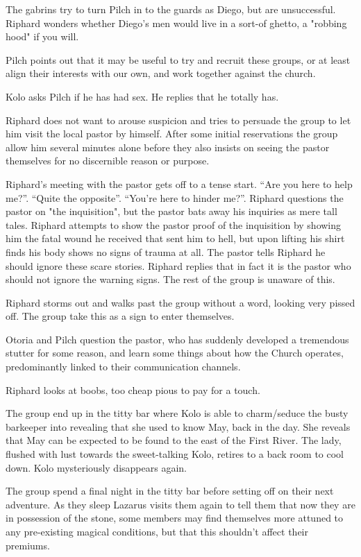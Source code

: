 The gabrins try to turn Pilch in to the guards as Diego, but are unsuccessful. Riphard wonders whether Diego's men would live in a sort-of ghetto, a "robbing hood" if you will.\medskip

Pilch points out that it may be useful to try and recruit these groups, or at least align their interests with our own, and work together against the church.\medskip

Kolo asks Pilch if he has had sex. He replies that he totally has.\medskip

Riphard does not want to arouse suspicion and tries to persuade the group to let him visit the local pastor by himself. After some initial reservations the group allow him several minutes alone before they also insists on seeing the pastor themselves for no discernible reason or purpose.\medskip

Riphard's meeting with the pastor gets off to a tense start. “Are you here to help me?”. “Quite the opposite”. “You’re here to hinder me?”. Riphard questions the pastor on "the inquisition", but the pastor bats away his inquiries as mere tall tales. Riphard attempts to show the pastor proof of the inquisition by showing him the fatal wound he received that sent him to hell, but upon lifting his shirt finds his body shows no signs of trauma at all. The pastor tells Riphard he should ignore these scare stories. Riphard replies that in fact it is the pastor who should not ignore the warning signs. The rest of the group is unaware of this.\medskip

Riphard storms out and walks past the group without a word, looking very pissed off. The group take this as a sign to enter themselves.\medskip

Otoria and Pilch question the pastor, who has suddenly developed a tremendous stutter for some reason, and learn some things about how the Church operates, predominantly linked to their communication channels.\medskip

Riphard looks at boobs, too cheap pious to pay for a touch.\medskip

The group end up in the titty bar where Kolo is able to charm/seduce the busty barkeeper into revealing that she used to know May, back in the day. She reveals that May can be expected to be found to the east of the First River. The lady, flushed with lust towards the sweet-talking Kolo, retires to a back room to cool down. Kolo mysteriously disappears again.\medskip

The group spend a final night in the titty bar before setting off on their next adventure. As they sleep Lazarus visits them again to tell them that now they are in possession of the stone, some members may find themselves more attuned to any pre-existing magical conditions, but that this shouldn't affect their premiums.\medskip

